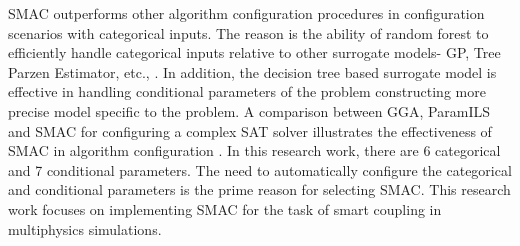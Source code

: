 SMAC outperforms other algorithm configuration procedures in configuration scenarios with categorical inputs. The reason is the ability of random forest to efficiently handle categorical inputs relative to other surrogate models- GP, Tree Parzen Estimator, etc., \cite{Hutterphd}. In addition, the decision tree based surrogate model is effective in handling conditional parameters of the problem constructing more precise model specific to the problem. A comparison between GGA, ParamILS and SMAC for configuring a complex SAT solver illustrates the effectiveness of SMAC in algorithm configuration \cite{SMAC_ParamILS_GGA_compare}. In this research work, there are 6 categorical and 7 conditional parameters. The need to automatically configure the categorical and conditional parameters is the prime reason for selecting SMAC. This research work focuses on implementing SMAC for the task of smart coupling in multiphysics simulations.


